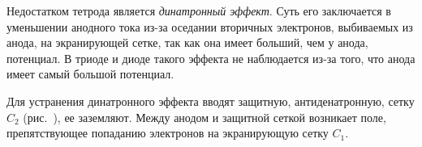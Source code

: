 Недостатком тетрода является \emph{динатронный эффект}. Суть его заключается в
уменьшении анодного тока из-за оседании вторичных электронов, выбиваемых из
анода, на экранирующей сетке, так как она имеет больший, чем у анода, потенциал.
В триоде и диоде такого эффекта не наблюдается из-за того, что анода имеет самый
большой потенциал.


Для устранения динатронного эффекта вводят защитную, антиденатронную, сетку
\( C_2 \) (рис.~), ее заземляют. Между анодом и защитной сеткой
возникает поле, препятствующее попаданию электронов на экранирующую сетку
\( C_1 \).
